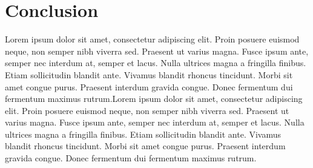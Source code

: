 \section{Conclusion}
Lorem ipsum dolor sit amet, consectetur adipiscing elit. Proin posuere euismod neque, non semper nibh viverra sed. Praesent ut varius magna. Fusce ipsum ante, semper nec interdum at, semper et lacus. Nulla ultrices magna a fringilla finibus. Etiam sollicitudin blandit ante. Vivamus blandit rhoncus tincidunt. Morbi sit amet congue purus. Praesent interdum gravida congue. Donec fermentum dui fermentum maximus rutrum.Lorem ipsum dolor sit amet, consectetur adipiscing elit. Proin posuere euismod neque, non semper nibh viverra sed. Praesent ut varius magna. Fusce ipsum ante, semper nec interdum at, semper et lacus. Nulla ultrices magna a fringilla finibus. Etiam sollicitudin blandit ante. Vivamus blandit rhoncus tincidunt. Morbi sit amet congue purus. Praesent interdum gravida congue. Donec fermentum dui fermentum maximus rutrum.




